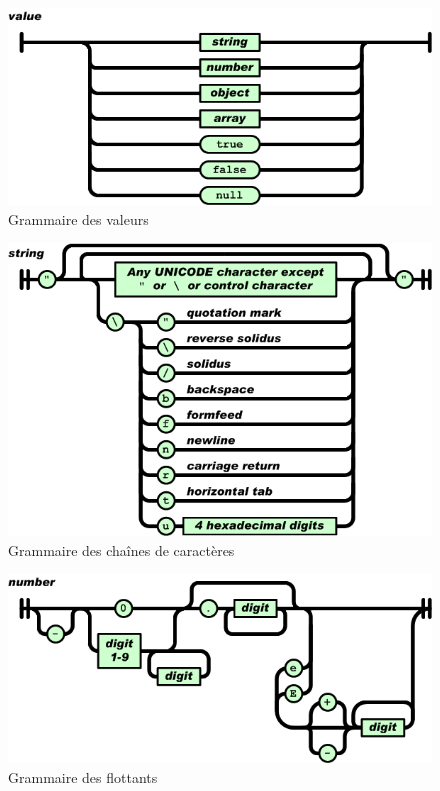 \documentclass[a4paper,11pt]{article}
\begin{document}
\begin{figure}[H]
\includegraphics[width=15cm]{gramm_value}
	\caption{Grammaire des valeurs}
\end{figure}

\begin{figure}[H]
\includegraphics[width=15cm]{gramm_string}
	\caption{Grammaire des chaînes de caractères}
\end{figure}

\begin{figure}[H]
\includegraphics[width=15cm]{gramm_number}
	\caption{Grammaire des flottants}
\end{figure}
\end{document}
